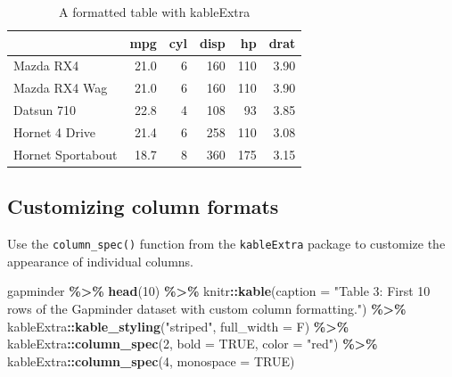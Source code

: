 \documentclass[
]{book}
\newenvironment{Shaded}{\begin{snugshade}}{\end{snugshade}}
\newcommand{\AttributeTok}[1]{\textcolor[rgb]{0.13,0.29,0.53}{#1}}
\newcommand{\ConstantTok}[1]{\textcolor[rgb]{0.56,0.35,0.01}{#1}}
\newcommand{\DecValTok}[1]{\textcolor[rgb]{0.00,0.00,0.81}{#1}}
\newcommand{\FunctionTok}[1]{\textcolor[rgb]{0.13,0.29,0.53}{\textbf{#1}}}
\newcommand{\NormalTok}[1]{#1}
\newcommand{\SpecialCharTok}[1]{\textcolor[rgb]{0.81,0.36,0.00}{\textbf{#1}}}
\newcommand{\StringTok}[1]{\textcolor[rgb]{0.31,0.60,0.02}{#1}}
\begin{document}
\begin{table}

\caption{\label{tab:unnamed-chunk-3}A formatted table with kableExtra}
\centering
\begin{tabular}[t]{l|r|r|r|r|r}
\hline
  & mpg & cyl & disp & hp & drat\\
\hline
Mazda RX4 & 21.0 & 6 & 160 & 110 & 3.90\\
\hline
Mazda RX4 Wag & 21.0 & 6 & 160 & 110 & 3.90\\
\hline
Datsun 710 & 22.8 & 4 & 108 & 93 & 3.85\\
\hline
Hornet 4 Drive & 21.4 & 6 & 258 & 110 & 3.08\\
\hline
Hornet Sportabout & 18.7 & 8 & 360 & 175 & 3.15\\
\hline
\end{tabular}
\end{table}

\hypertarget{customizing-column-formats}{%
\subsection{Customizing column formats}\label{customizing-column-formats}}

Use the \texttt{column\_spec()} function from the \texttt{kableExtra} package to customize the appearance of individual columns.

\begin{Shaded}
\begin{Highlighting}[]
\NormalTok{gapminder }\SpecialCharTok{\%\textgreater{}\%}
  \FunctionTok{head}\NormalTok{(}\DecValTok{10}\NormalTok{) }\SpecialCharTok{\%\textgreater{}\%}
\NormalTok{  knitr}\SpecialCharTok{::}\FunctionTok{kable}\NormalTok{(}\AttributeTok{caption =} \StringTok{"Table 3: First 10 rows of the Gapminder dataset with custom column formatting."}\NormalTok{) }\SpecialCharTok{\%\textgreater{}\%}
\NormalTok{  kableExtra}\SpecialCharTok{::}\FunctionTok{kable\_styling}\NormalTok{(}\StringTok{"striped"}\NormalTok{, }\AttributeTok{full\_width =}\NormalTok{ F) }\SpecialCharTok{\%\textgreater{}\%}
\NormalTok{  kableExtra}\SpecialCharTok{::}\FunctionTok{column\_spec}\NormalTok{(}\DecValTok{2}\NormalTok{, }\AttributeTok{bold =} \ConstantTok{TRUE}\NormalTok{, }\AttributeTok{color =} \StringTok{"red"}\NormalTok{) }\SpecialCharTok{\%\textgreater{}\%}
\NormalTok{  kableExtra}\SpecialCharTok{::}\FunctionTok{column\_spec}\NormalTok{(}\DecValTok{4}\NormalTok{, }\AttributeTok{monospace =} \ConstantTok{TRUE}\NormalTok{)}
\end{Highlighting}
\end{Shaded}
\end{document}
